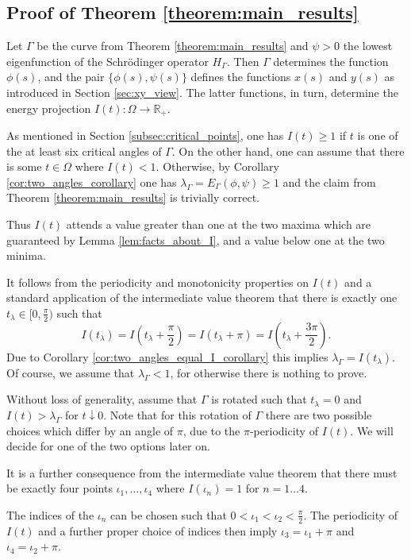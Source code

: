 \documentclass{article}
\newcommand{\R}{\mathbb{R}\xspace}
\begin{document}
\subsection{Proof of Theorem \ref{theorem:main_results}}

Let $\Gamma$ be the curve from Theorem \ref{theorem:main_results} and $\psi>0$ the lowest eigenfunction of the Schrödinger operator $H_\Gamma$. Then $\Gamma$ determines the function $\phi(s)$, and the pair $\{\phi(s), \psi(s)\}$ defines the functions $x(s)$ and $y(s)$ as introduced in Section \ref{sec:xy_view}. The latter functions, in turn, determine the energy projection $I(t): \Omega \rightarrow \R_+$.

As mentioned in Section \ref{subsec:critical_points}, one has $I(t)\ge 1$ if $t$ is one of the at least six critical angles of $\Gamma$. On the other hand, one can assume that there is some $t\in\Omega$ where $I(t) < 1$. Otherwise, by Corollary \ref{cor:two_angles_corollary} one has $\lambda_\Gamma = E_\Gamma(\phi,\psi) \ge 1$ and the claim from Theorem \ref{theorem:main_results} is trivially correct.

Thus $I(t)$ attends a value greater than one at the two maxima which are guaranteed by Lemma \ref{lem:facts_about_I}, and a value below one at the two minima. 

It follows from the periodicity and monotonicity properties on $I(t)$ and a standard application of the intermediate value theorem that there is exactly one $t_\lambda \in [0, \frac{\pi}{2})$ such that
\[I(t_\lambda) = I(t_\lambda + \frac\pi2) = I(t_\lambda + \pi) = I(t_\lambda + \frac{3\pi}{2}).\]
Due to Corollary \ref{cor:two_angles_equal_I_corollary} this implies $\lambda_\Gamma = I(t_\lambda)$. Of course, we assume that $\lambda_\Gamma < 1$, for otherwise there is nothing to prove.

Without loss of generality, assume that $\Gamma$ is rotated such that $t_\lambda = 0$ and $I(t) > \lambda_\Gamma$ for $t \downarrow 0$. Note that for this rotation of $\Gamma$ there are two possible choices which differ by an angle of $\pi$, due to the $\pi$-periodicity of $I(t)$. We will decide for one of the two options later on.

It is a further consequence from the intermediate value theorem that there must be exactly four points $\iota_1, \dots, \iota_4$ where $I(\iota_n) = 1$ for $n = 1\dots 4$.

The indices of the $\iota_n$ can be chosen such that $0 < \iota_1 < \iota_2 < \frac{\pi}{2}$. The periodicity of $I(t)$ and a further proper choice of indices then imply $\iota_3 = \iota_1 + \pi$ and $\iota_4 = \iota_2 + \pi$.
\end{document}
